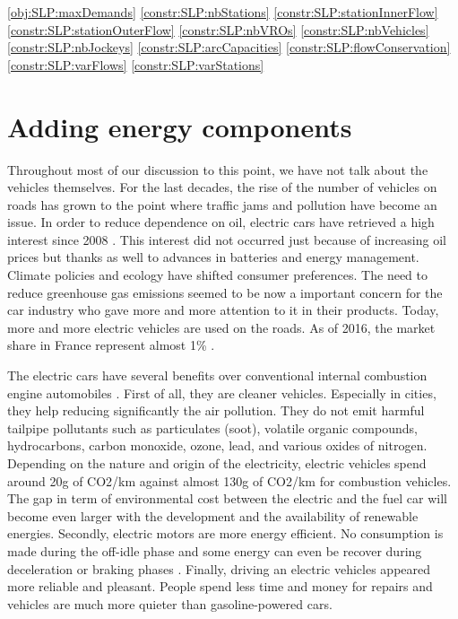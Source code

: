 \begin{bibunit}[ieeetr]
\eqref{obj:SLP:maxDemands}
\eqref{constr:SLP:nbStations}
\eqref{constr:SLP:stationInnerFlow}
\eqref{constr:SLP:stationOuterFlow}
\eqref{constr:SLP:nbVROs}
\eqref{constr:SLP:nbVehicles}
\eqref{constr:SLP:nbJockeys}
\eqref{constr:SLP:arcCapacities}
\eqref{constr:SLP:flowConservation}
\eqref{constr:SLP:varFlows}
\eqref{constr:SLP:varStations}


\newpage
\section{Adding energy components}
Throughout most of our discussion to this point, we have not talk about the vehicles themselves.
For the last decades, the rise of the number of vehicles on roads has grown to the point where traffic jams and pollution have become an issue.
In order to reduce dependence on oil, electric cars have retrieved a high interest since 2008 \cite{sperling_two_2009}.
This interest did not occurred just because of increasing oil prices but thanks as well to advances in batteries and energy management.
Climate policies and ecology have shifted consumer preferences.
The need to reduce greenhouse gas emissions seemed to be now a important concern for the car industry who  gave more and more attention to it in their products.
Today, more and more electric vehicles are used on the roads.
As of 2016, the market share in France represent almost 1\% \cite{VE_MarketShare2016}.

\medskip
The electric cars have several benefits over conventional internal combustion engine automobiles \cite{VE_avantages}.
First of all, they are cleaner vehicles.
Especially in cities, they help reducing significantly the air pollution.
They do not emit harmful tailpipe pollutants such as particulates (soot), volatile organic compounds, hydrocarbons, carbon monoxide, ozone, lead, and various oxides of nitrogen.
Depending on the nature and origin of the electricity, electric vehicles spend around 20g of CO2/km against almost 130g of CO2/km for combustion vehicles.
The gap in term of environmental cost between the electric and the fuel car will become even larger with the development and the availability of renewable energies.
Secondly, electric motors are more energy efficient.
No consumption is made during the off-idle phase and some energy can even be recover during deceleration or braking phases \cite{artmeier_optimal_2010}.
Finally, driving an electric vehicles appeared more reliable and pleasant.
People spend less time and money for repairs and vehicles are much more quieter than gasoline-powered cars.


\end{bibunit}
